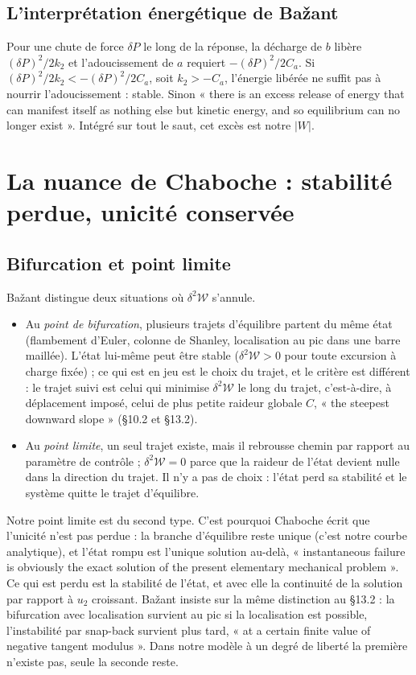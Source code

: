\documentclass[11pt,a4paper]{article}
\newcommand{\dW}{\delta^2\mathcal W}
\begin{document}
\subsection{L'interprétation énergétique de Bažant}
Pour une chute de force $\delta P$ le long de la réponse, la décharge de $b$ libère
$(\delta P)^2/2k_2$ et l'adoucissement de $a$ requiert $-(\delta P)^2/2C_a$. Si
$(\delta P)^2/2k_2 < -(\delta P)^2/2C_a$, soit $k_2 > -C_a$, l'énergie libérée ne suffit pas à
nourrir l'adoucissement : stable. Sinon « there is an excess release of energy that can
manifest itself as nothing else but kinetic energy, and so equilibrium can no longer exist ».
Intégré sur tout le saut, cet excès est notre $|W|$.

\section{La nuance de Chaboche : stabilité perdue, unicité conservée}
\label{sec:trajet}

\subsection{Bifurcation et point limite}
Bažant distingue deux situations où $\dW$ s'annule.
\begin{itemize}[nosep]
  \item Au \emph{point de bifurcation}, plusieurs trajets d'équilibre partent du même état
        (flambement d'Euler, colonne de Shanley, localisation au pic dans une barre maillée).
        L'état lui-même peut être stable ($\dW > 0$ pour toute excursion à charge fixée) ; ce qui
        est en jeu est le choix du trajet, et le critère est différent : le trajet suivi est
        celui qui minimise $\dW$ le long du trajet, c'est-à-dire, à déplacement imposé, celui de
        plus petite raideur globale $C$, « the steepest downward slope » (§10.2 et §13.2).
  \item Au \emph{point limite}, un seul trajet existe, mais il rebrousse chemin par rapport au
        paramètre de contrôle ; $\dW = 0$ parce que la raideur de l'état devient nulle dans la
        direction du trajet. Il n'y a pas de choix : l'état perd sa stabilité et le système
        quitte le trajet d'équilibre.
\end{itemize}
Notre point limite est du second type. C'est pourquoi Chaboche écrit que l'unicité n'est pas
perdue : la branche d'équilibre reste unique (c'est notre courbe analytique), et l'état rompu
est l'unique solution au-delà, « instantaneous failure is obviously the exact solution of the
present elementary mechanical problem ». Ce qui est perdu est la stabilité de l'état, et avec
elle la continuité de la solution par rapport à $u_2$ croissant. Bažant insiste sur la même
distinction au §13.2 : la bifurcation avec localisation survient au pic si la localisation est
possible, l'instabilité par snap-back survient plus tard, « at a certain finite value of
negative tangent modulus ». Dans notre modèle à un degré de liberté la première n'existe pas,
seule la seconde reste.
\end{document}
